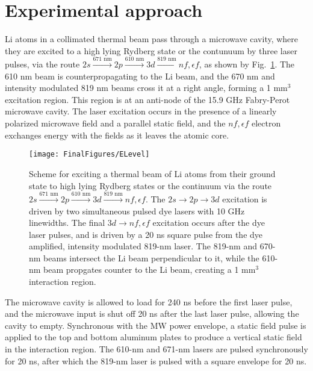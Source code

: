 \documentclass[aps,pra,preprint,groupedaddress]{revtex4-1}
\begin{document}
\section{\label{sec:exp} Experimental approach}


Li atoms in a collimated thermal beam pass through a microwave cavity, where they are excited to a high lying Rydberg state or the contunuum by three laser pulses, via the route $2s \xrightarrow{\text{671 nm}} 2p \xrightarrow{\text{610 nm}} 3d \xrightarrow{\text{819 nm}} nf, \epsilon f$, as shown by Fig.~\ref{fig:ELev}. The 610 nm beam is counterpropagating to the Li beam, and the 670 nm and intensity modulated 819 nm beams cross it at a right angle, forming a 1 mm$^3$ excitation region. This region is at an anti-node of the 15.9 GHz Fabry-Perot microwave cavity. The laser excitation occurs in the presence of a linearly polarized microwave field and a parallel static field, and the $nf, \epsilon f$ electron exchanges energy with the fields as it leaves the atomic core.

\begin{figure}
	\texttt{[image: FinalFigures/ELevel]}
	\caption{Scheme for exciting a thermal beam of Li atoms from their ground state to high lying Rydberg states or the continuum via the route $2s \xrightarrow{\text{671 nm}} 2p \xrightarrow{\text{610 nm}} 3d \xrightarrow{\text{819 nm}} nf, \epsilon f$. The $2s \rightarrow 2p \rightarrow 3d$ excitation is driven by two simultaneous pulsed dye lasers with 10 GHz linewidths. The final $3d \rightarrow nf, \epsilon f$ excitation occurs after the dye laser pulses, and is driven by a 20 ns square pulse from the dye amplified, intensity modulated 819-nm laser. The 819-nm and 670-nm beams intersect the Li beam perpendicular to it, while the 610-nm beam propgates counter to the Li beam, creating a 1 mm$^3$ interaction region.}
	\label{fig:ELev}
\end{figure}



The microwave cavity is allowed to load for 240 ns before the first laser pulse, and the microwave input is shut off 20 ns after the last laser pulse, allowing the cavity to empty. Synchronous with the MW power envelope, a static field pulse is applied to the top and bottom aluminum plates to produce a vertical static field in the interaction region. The 610-nm and 671-nm lasers are pulsed synchronously for 20 ns, after which the 819-nm laser is pulsed with a square envelope for 20 ns.
\end{document}
